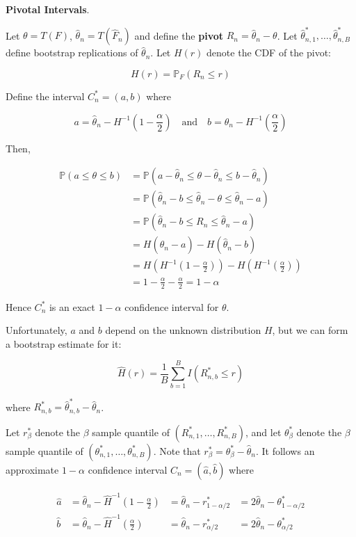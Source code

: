 \textbf{Pivotal Intervals}.

Let \(\theta = T(F)\), \(\hat{\theta}_{n} = T(\hat{F}_{n})\) and define the
\textbf{pivot} \(R_{n} = \hat{\theta}_{n}  - \theta\). Let
\(\hat{\theta}_{n, 1}^*, \dots, \hat{\theta}_{n, B}^*\) define bootstrap
replications of \(\hat{\theta}_{n}\). Let \(H(r)\) denote the CDF of the
pivot:

\[ H(r) = \mathbb{P}_F(R_{n} \leq r)\]

Define the interval \(C_{n}^* = (a, b)\) where

\[
a = \hat{\theta}_{n} - H^{-1}\left( 1 - \frac{\alpha}{2} \right) 
\quad\text{and}\quad
b = \hat{\theta}_{n} - H^{-1}\left( \frac{\alpha}{2} \right) 
\]

Then,

\begin{align*}
\mathbb{P}(a \leq \theta \leq b) &= \mathbb{P}(a - \hat{\theta}_{n} \leq \theta - \hat{\theta}_{n} \leq b - \hat{\theta}_{n}) \\
&= \mathbb{P}(\hat{\theta}_{n} - b \leq \hat{\theta}_{n} - \theta \leq \hat{\theta}_{n} - a) \\
&= \mathbb{P}(\hat{\theta}_{n} - b \leq R_{n} \leq \hat{\theta}_{n} - a) \\
&= H(\hat{\theta}_{n} - a) - H(\hat{\theta}_{n} - b) \\
&= H\left(H^{-1}\left( 1 - \frac{\alpha}{2} \right) \right) - H\left(H^{-1}\left( \frac{\alpha}{2} \right)\right) \\
&= 1 - \frac{\alpha}{2}  - \frac{\alpha}{2} = 1 - \alpha
\end{align*}

Hence \(C_{n}^*\) is an exact \(1 - \alpha\) confidence interval for
\(\theta\).

Unfortunately, \(a\) and \(b\) depend on the unknown distribution \(H\),
but we can form a bootstrap estimate for it:

\[\hat{H}(r) = \frac{1}{B} \sum_{b=1}^B I(R_{n, b}^* \leq r)\]

where \(R_{n, b}^* = \hat{\theta}_{n, b}^* - \hat{\theta}_{n}\).

Let \(r_\beta^*\) denote the \(\beta\) sample quantile of
\((R_{n, 1}^*, \dots, R_{n, B}^*)\), and let \(\theta_\beta^*\) denote
the \(\beta\) sample quantile of
\((\theta_{n, 1}^*, \dots, \theta_{n, B}^*)\). Note that
\(r_\beta^* = \theta_\beta^* - \hat{\theta}_{n}\). It follows an
approximate \(1 - \alpha\) confidence interval
\(C_{n} = (\hat{a}, \hat{b})\) where

\begin{align*}
\hat{a} 
&= \hat{\theta}_{n} - \hat{H}^{-1}\left(1 - \frac{\alpha}{2}\right) 
&= \hat{\theta}_{n} - r_{1 - \alpha/2}^* 
&= 2\hat{\theta}_{n} - \theta_{1 - \alpha/2}^* \\
\hat{b} 
&= \hat{\theta}_{n} - \hat{H}^{-1}\left(\frac{\alpha}{2}\right) 
&= \hat{\theta}_{n} - r_{\alpha/2}^* 
&= 2\hat{\theta}_{n} - \theta_{\alpha/2}^* 
\end{align*}


